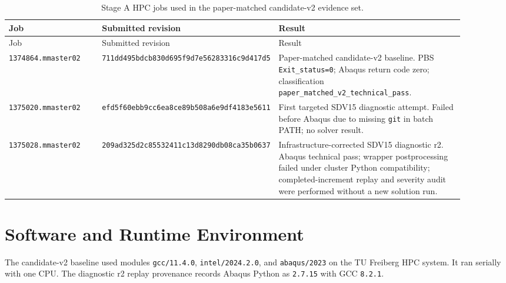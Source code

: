 \begin{longtable}{p{0.22\linewidth}p{0.22\linewidth}p{0.46\linewidth}}
\caption{Stage A HPC jobs used in the paper-matched candidate-v2 evidence set.}\\
\toprule
Job & Submitted revision & Result \\
\midrule
\endfirsthead
\toprule
Job & Submitted revision & Result \\
\midrule
\endhead
\texttt{1374864.mmaster02} & \texttt{711dd495bdcb830d695f9d7e56283316c9d417d5} & Paper-matched candidate-v2 baseline. PBS \texttt{Exit\_status=0}; Abaqus return code zero; classification \texttt{paper\_matched\_v2\_technical\_pass}. \\
\texttt{1375020.mmaster02} & \texttt{efd5f60ebb9cc6ea8ce89b508a6e9df4183e5611} & First targeted SDV15 diagnostic attempt. Failed before Abaqus due to missing \texttt{git} in batch PATH; no solver result. \\
\texttt{1375028.mmaster02} & \texttt{209ad325d2c85532411c13d8290db08ca35b0637} & Infrastructure-corrected SDV15 diagnostic r2. Abaqus technical pass; wrapper postprocessing failed under cluster Python compatibility; completed-increment replay and severity audit were performed without a new solution run. \\
\bottomrule
\end{longtable}

\section{Software and Runtime Environment}

The candidate-v2 baseline used modules \texttt{gcc/11.4.0},
\texttt{intel/2024.2.0}, and \texttt{abaqus/2023} on the TU Freiberg HPC
system. It ran serially with one CPU. The diagnostic r2 replay provenance
records Abaqus Python as \texttt{2.7.15} with GCC \texttt{8.2.1}.

